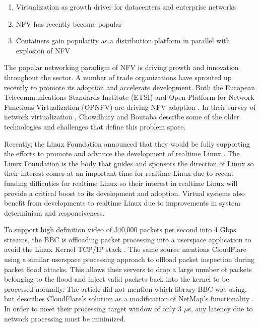 \begin{enumerate}
  \item Virtualization as growth driver for datacenters and enterprise networks
  \item NFV has recently become popular 
  \item Containers gain popularity as a distribution platform in parallel with explosion of NFV
\end{enumerate}

The popular networking paradigm of NFV is driving growth and innovation throughout the sector.
A number of trade organizations have sprouted up recently to promote its adoption and accelerate development.
Both the European Telecommunications Standards Institute (ETSI) and Open Platform for Network Functions Virtualization (OPNFV) \autocite{opnfv1} are driving NFV adoption \autocite{cohnopnfv}.
In their survey of network virtualization \autocite{_chowdhury_1}, Chowdhury and Boutaba describe some of the older technologies and challenges that define this problem space.


Recently, the Linux Foundation announced that they would be fully supporting the efforts to promote and advance the development of realtime Linux \autocite{_linux_foundation_1}.
The Linux Foundation is the body that guides and sponsors the direction of Linux so their interest comes at an important time for realtime Linux due to recent funding difficuties for realtime Linux \autocite{_lwn_1} so their interest in realtime Linux will provide a critical boost to its development and adoption.
Virtual systems also benefit from developments to realtime Linux due to improvements in system determinism and responsiveness.

To support high definition video of 340,000 packets per second into 4 Gbps streams, the BBC is offloading packet processing into a userspace application to avoid the Linux Kernel TCP/IP stack \autocite{bbcbypass}.   
The same source mentions CloudFlare using a similar userspace processing approach to offload packet inspection during packet flood attacks.
This allows their servers to drop a large number of packets belonging to the flood and inject valid packets back into the kernel to be processed normally.  
The article did not mention which library BBC was using, but describes CloudFlare's solution as a modification of NetMap's functionality \autocite{netmapbertin}.
In order to meet their processing target window of only 3 $\mu$s, any latency due to network processing must be minimized.

